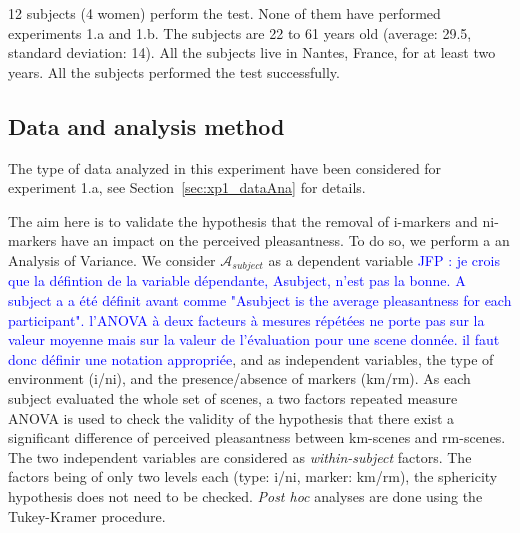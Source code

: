 \documentclass[preprint,12pt]{elsarticle}
\newcommand{\jfp}[1]{\textcolor{blue}{JFP : #1}}
\begin{document}
12 subjects (4 women) perform the test. None of them have performed experiments 1.a and 1.b. The subjects are 22 to 61 years old (average: 29.5, standard deviation: 14). All the subjects live in Nantes, France, for at least two years. All the subjects performed the test successfully.

\subsection{Data and analysis method}


The type of data analyzed in this experiment have been considered for experiment 1.a, see Section~\ref{sec:xp1_dataAna} for details.


The aim here is to validate the hypothesis that the removal of i-markers and ni-markers have an impact on the perceived pleasantness. To do so, we perform a an Analysis of Variance. We consider $\mathcal{A}_{subject}$ as a dependent variable \jfp{je crois que la défintion de la variable dépendante, Asubject, n'est pas la bonne. A subject a a été définit avant comme "Asubject is
the average pleasantness for each participant". l'ANOVA à deux facteurs à mesures répétées ne porte pas sur la valeur moyenne mais sur la valeur de l'évaluation pour une scene donnée. il faut donc définir une notation appropriée}, and as independent variables, the type of environment (i/ni), and the presence/absence of markers (km/rm). As each subject evaluated the whole set of scenes, a two factors repeated measure ANOVA is used to check the validity of the hypothesis that there exist a significant difference of perceived pleasantness between km-scenes and rm-scenes. The two independent variables are considered as \emph{within-subject} factors. The factors being of only two levels each (type: i/ni,  marker: km/rm), the sphericity hypothesis does not need to be checked. \emph{Post hoc} analyses are done using the Tukey-Kramer procedure.
\end{document}
